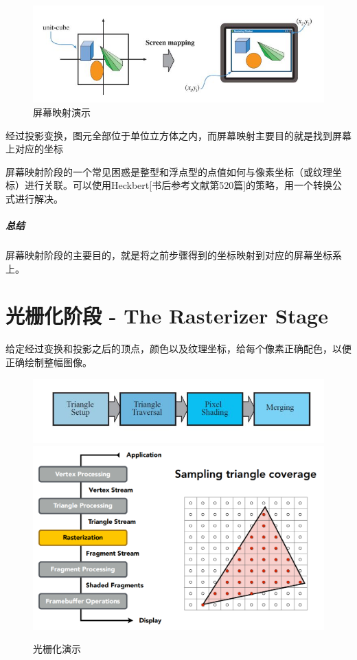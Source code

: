 \documentclass[UTF8,a4paper,12pt]{ctexbook}
\begin{document}
				\begin{figure}[H]
					\centering
					\includegraphics[scale=0.57]{scMap}
					\caption{屏幕映射演示}
				\end{figure}
	
			经过投影变换，图元全部位于单位立方体之内，而屏幕映射主要目的就是找到屏幕上对应的坐标
			
			屏幕映射阶段的一个常见困惑是整型和浮点型的点值如何与像素坐标（或纹理坐标）进行关联。可以使用Heckbert[书后参考文献第520篇]的策略，用一个转换公式进行解决。
			
			\subparagraph{总结}屏幕映射阶段的主要目的，就是将之前步骤得到的坐标映射到对应的屏幕坐标系上。
			
	\section{光栅化阶段 - The Rasterizer Stage}
		给定经过变换和投影之后的顶点，颜色以及纹理坐标，给每个像素正确配色，以便正确绘制整幅图像。
			\begin{figure}[H]
				\centering
				\includegraphics[scale=0.7]{Rasterization}
				\includegraphics[width=\linewidth]{RasterizationPipeLine}
				\caption{光栅化演示}
			\end{figure}
			
\end{document}
